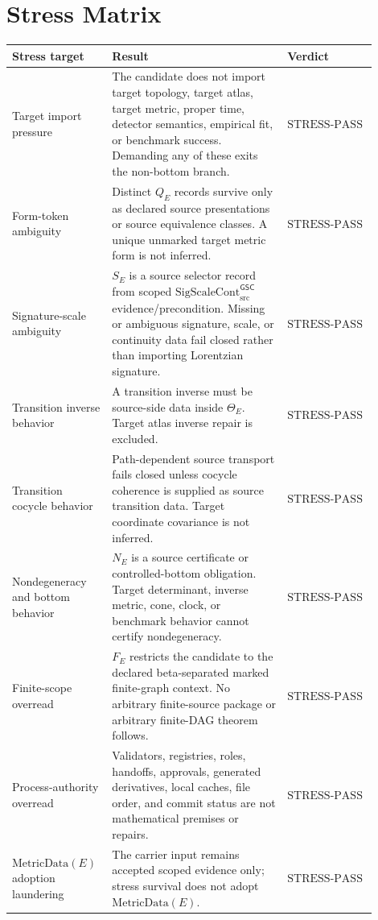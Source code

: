 \documentclass[11pt]{article}
\newcommand{\SigScaleCont}{\mathrm{SigScaleCont}^{\mathsf{GSC}}_{\mathrm{src}}}
\newcommand{\StressPass}{\mathrm{STRESS\mbox{-}PASS}}
\begin{document}
\section{Stress Matrix}

\begin{longtable}{p{0.26\linewidth}p{0.46\linewidth}p{0.18\linewidth}}
\toprule
Stress target & Result & Verdict \\
\midrule
Target import pressure & The candidate does not import target topology,
target atlas, target metric, proper time, detector semantics, empirical fit,
or benchmark success. Demanding any of these exits the non-bottom branch. &
\(\StressPass\) \\
Form-token ambiguity & Distinct \(Q_E\) records survive only as declared
source presentations or source equivalence classes. A unique unmarked target
metric form is not inferred. & \(\StressPass\) \\
Signature-scale ambiguity & \(S_E\) is a source selector record from scoped
\(\SigScaleCont\) evidence/precondition. Missing or ambiguous signature,
scale, or continuity data fail closed rather than importing Lorentzian
signature. & \(\StressPass\) \\
Transition inverse behavior & A transition inverse must be source-side data
inside \(\Theta_E\). Target atlas inverse repair is excluded. & \(\StressPass\) \\
Transition cocycle behavior & Path-dependent source transport fails closed
unless cocycle coherence is supplied as source transition data. Target
coordinate covariance is not inferred. & \(\StressPass\) \\
Nondegeneracy and bottom behavior & \(N_E\) is a source certificate or
controlled-bottom obligation. Target determinant, inverse metric, cone,
clock, or benchmark behavior cannot certify nondegeneracy. & \(\StressPass\) \\
Finite-scope overread & \(F_E\) restricts the candidate to the declared
beta-separated marked finite-graph context. No arbitrary finite-source package
or arbitrary finite-DAG theorem follows. & \(\StressPass\) \\
Process-authority overread & Validators, registries, roles, handoffs,
approvals, generated derivatives, local caches, file order, and commit status
are not mathematical premises or repairs. & \(\StressPass\) \\
\(\mathrm{MetricData}(E)\) adoption laundering & The carrier input remains
accepted scoped evidence only; stress survival does not adopt
\(\mathrm{MetricData}(E)\). & \(\StressPass\) \\

\end{longtable}
\end{document}
